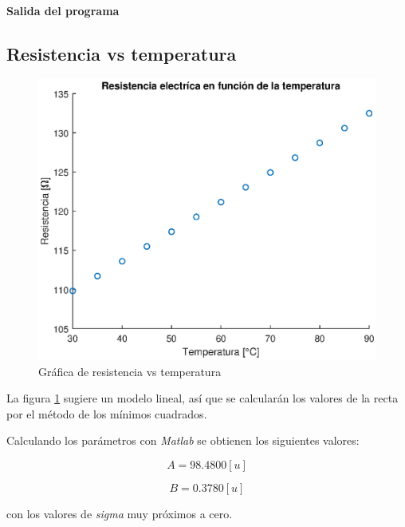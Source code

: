 \documentclass[letter,11pt]{article}
\begin{document}
\paragraph{Salida del programa}
\begin{alltt}
\footnotesize

\normalsize
\end{alltt}

\newpage
\subsection{Resistencia vs temperatura}
\begin{figure}[!h]
\centering
\includegraphics[scale=1.00]{resources/3.3.1.eps}
\caption{Gráfica de resistencia vs temperatura}
\label{practica43}
\end{figure}

La figura \ref{practica43} sugiere un modelo lineal, así que se calcularán los
valores de la recta por el método de los mínimos cuadrados.

Calculando los parámetros con \emph{Matlab} se obtienen los siguientes valores:

\begin{equation}
    A = 98.4800 [u]
\end{equation}

\begin{equation}
    B = 0.3780 [u]
\end{equation}

con los valores de \emph{sigma} muy próximos a cero.
\end{document}
